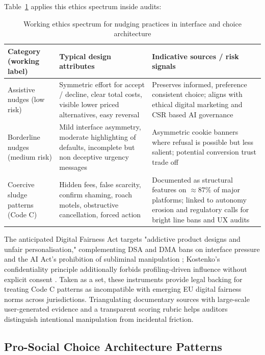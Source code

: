 \documentclass[11pt]{article}
\begin{document}
Table~\ref{tab:nudging_spectrum} applies this ethics spectrum inside audits: \begin{table}[H] \centering \caption{Working ethics spectrum for nudging practices in interface and choice architecture} \label{tab:nudging_spectrum} \begin{tabular}{p{3cm}p{4.2cm}p{4.2cm}} \hline Category (working label) & Typical design attributes & Indicative sources / risk signals \\ \hline Assistive nudges (low risk) & Symmetric effort for accept / decline, clear total costs, visible lower priced alternatives, easy reversal & Preserves informed, preference consistent choice; aligns with ethical digital marketing and CSR based AI governance \parencites[33]{6087241}[16]{8200246} \\ Borderline nudges (medium risk) & Mild interface asymmetry, moderate highlighting of defaults, incomplete but non deceptive urgency messages & Asymmetric cookie banners where refusal is possible but less salient; potential conversion trust trade off \parencites[33]{6087241} \\ Coercive sludge patterns (Code C) & Hidden fees, false scarcity, confirm shaming, roach motels, obstructive cancellation, forced action & Documented as structural features on $\approx 87\%$ of major platforms; linked to autonomy erosion and regulatory calls for bright line bans and UX audits \parencites[7]{6295677}[14]{6295677}[390]{7896734} \\ \hline \end{tabular} \end{table} The anticipated Digital Fairness Act targets "addictive product designs and unfair personalisation," complementing DSA and DMA bans on interface pressure and the AI Act's prohibition of subliminal manipulation \parencites[390]{7896734}[21]{6941611}; Kostenko's confidentiality principle additionally forbids profiling-driven influence without explicit consent \parencites[44]{2977039}. Taken as a set, these instruments provide legal backing for treating Code C patterns as incompatible with emerging EU digital fairness norms across jurisdictions. Triangulating documentary sources with large-scale user-generated evidence and a transparent scoring rubric \parencites[5]{4499345} helps auditors distinguish intentional manipulation from incidental friction.

\subsection{Pro-Social Choice Architecture Patterns}
\end{document}
